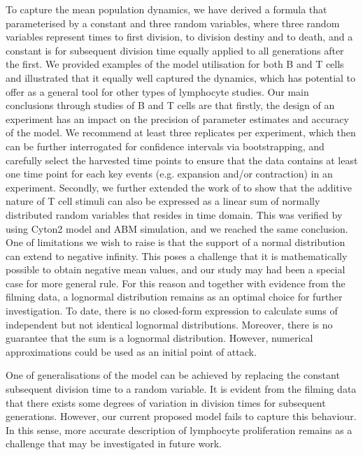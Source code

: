 \documentclass[11pt, a4paper]{article}
\begin{document}
To capture the mean population dynamics, we have derived a formula that parameterised by a constant and three random variables, where three random variables represent times to first division, to division destiny and to death, and a constant is for subsequent division time equally applied to all generations after the first. We provided examples of the model utilisation for both B and T cells and illustrated that it equally well captured the dynamics, which has potential to offer as a general tool for other types of lymphocyte studies. Our main conclusions through studies of B and T cells are that firstly, the design of an experiment has an impact on the precision of parameter estimates and accuracy of the model. We recommend at least three replicates per experiment, which then can be further interrogated for confidence intervals via bootstrapping, and carefully select the harvested time points to ensure that the data contains at least one time point for each key events (e.g. expansion and/or contraction) in an experiment. Secondly, we further extended the work of \cite{Marchingo.2014} to show that the additive nature of T cell stimuli can also be expressed as a linear sum of normally distributed random variables that resides in time domain. This was verified by using Cyton2 model and ABM simulation, and we reached the same conclusion. One of limitations we wish to raise is that the support of a normal distribution can extend to negative infinity. This poses a challenge that it is mathematically possible to obtain negative mean values, and our study may had been a special case for more general rule. For this reason and together with evidence from the filming data, a lognormal distribution remains as an optimal choice for further investigation. To date, there is no closed-form expression to calculate sums of independent but not identical lognormal distributions. Moreover, there is no guarantee that the sum is a lognormal distribution. However, numerical approximations \parencite{Mehta.2007, Lo.2012} could be used as an initial point of attack.

One of generalisations of the model can be achieved by replacing the constant subsequent division time to a random variable. It is evident from the filming data that there exists some degrees of variation in division times for subsequent generations. However, our current proposed model fails to capture this behaviour. In this sense, more accurate description of lymphocyte proliferation remains as a challenge that may be investigated in future work.
\end{document}
